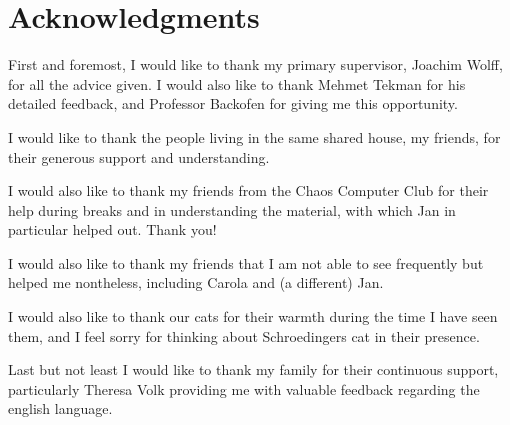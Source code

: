 \chapter{Acknowledgments}

First and foremost, I would like to thank my primary supervisor, Joachim Wolff,
for all the advice given. I would also like to thank Mehmet Tekman for his
detailed feedback, and Professor Backofen for giving me this opportunity.

I would like to thank the people living in the same shared house, my friends,
for their generous support and understanding.

I would also like to thank my friends from the Chaos Computer Club for their
help during breaks and in understanding the material, with which Jan in
particular helped out. Thank you!

I would also like to thank my friends that I am not able to see frequently but
helped me nontheless, including Carola and (a different) Jan.

I would also like to thank our cats for their warmth during the time I have seen
them, and I feel sorry for thinking about Schroedingers cat in their presence.

Last but not least I would like to thank my family for their continuous
support, particularly Theresa Volk providing me with valuable feedback
regarding the english language.


